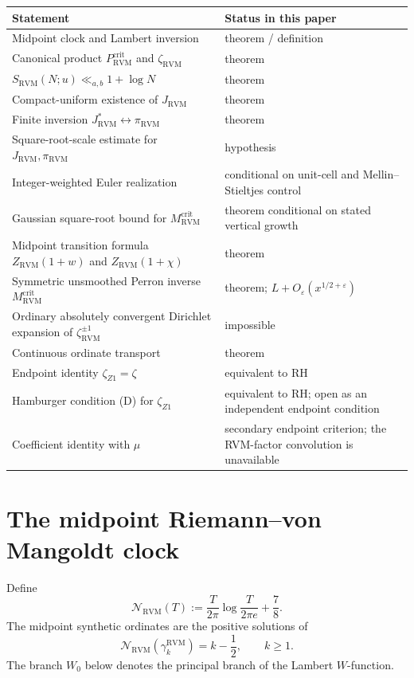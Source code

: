 \documentclass[11pt,reqno]{amsart}
\theoremstyle{definition}
\theoremstyle{remark}
\newcommand{\RVM}{\mathrm{RVM}}
\newcommand{\crit}{\mathrm{crit}}
\begin{document}
\begin{center}
\begin{tabular}{p{}p{}}
\toprule
Statement & Status in this paper\\
\midrule
Midpoint clock and Lambert inversion & theorem / definition\\
Canonical product $P_{\RVM}^{\crit}$ and $\zeta_{\RVM}$ & theorem\\
$S_{\RVM}(N;u)\ll_{a,b}1+\log N$ & theorem\\
Compact-uniform existence of $J_{\RVM}$ & theorem\\
Finite inversion $J_{\RVM}^{*}\leftrightarrow\pi_{\RVM}$ & theorem\\
Square-root-scale estimate for $J_{\RVM},\pi_{\RVM}$ & hypothesis\\
Integer-weighted Euler realization & conditional on unit-cell and Mellin--Stieltjes control\\
Gaussian square-root bound for $M_{\RVM}^{\crit}$ & theorem conditional on stated vertical growth\\
Midpoint transition formula $Z_{\RVM}(1+w)$ and $Z_{\RVM}(1+\chi)$ & theorem\\
Symmetric unsmoothed Perron inverse $M_{\RVM}^{\crit}$ & theorem; $L+O_\varepsilon(x^{1/2+\varepsilon})$\\
Ordinary absolutely convergent Dirichlet expansion of $\zeta_{\RVM}^{\pm1}$ & impossible\\
Continuous ordinate transport & theorem\\
Endpoint identity $\zeta_{Z1}=\zeta$ & equivalent to RH\\
Hamburger condition (D) for $\zeta_{Z1}$ & equivalent to RH; open as an independent endpoint condition\\
Coefficient identity with $\mu$ & secondary endpoint criterion; the RVM-factor convolution is unavailable\\
\bottomrule
\end{tabular}
\end{center}

\section{The midpoint Riemann--von Mangoldt clock}

Define
\begin{equation}\label{eq:clock}
 \mathcal N_{\RVM}(T)
 :=\frac{T}{2\pi}\log\frac{T}{2\pi e}+\frac78.
\end{equation}
The midpoint synthetic ordinates are the positive solutions of
\begin{equation}\label{eq:midpoint-condition}
 \mathcal N_{\RVM}(\gamma_k^{\RVM})=k-\frac12,
 \qquad k\ge1.
\end{equation}
The branch $W_0$ below denotes the principal branch of the Lambert $W$-function.
\end{document}

